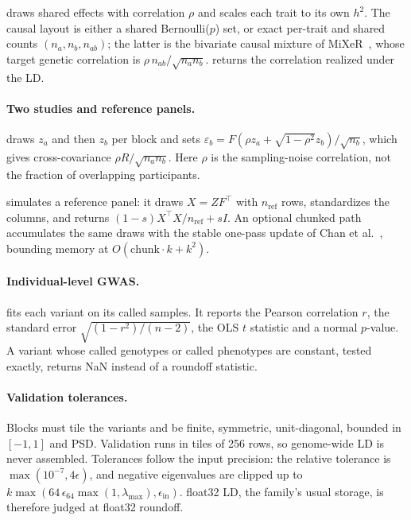\documentclass[11pt,a4paper]{article}
\begin{document}
 draws shared effects with correlation
$\rho$ and scales each trait to its own $h^2$. The causal layout is either
a shared Bernoulli($p$) set, or exact per-trait and shared counts
$(n_a,n_b,n_{ab})$; the latter is the bivariate causal mixture of
MiXeR~\cite{frei2019}, whose target genetic correlation is
$\rho\,n_{ab}/\sqrt{n_an_b}$.  returns the
correlation realized under the LD.

\paragraph{Two studies and reference panels.}
 draws $z_a$ and then $z_b$ per block and
sets $\varepsilon_b=F(\rho z_a+\sqrt{1-\rho^2}z_b)/\sqrt{n_b}$, which gives
cross-covariance $\rho R/\sqrt{n_an_b}$. Here $\rho$ is the
sampling-noise correlation, not the fraction of overlapping participants.

 simulates a reference panel: it draws $X=ZF^\top$ with
$n_{\mathrm{ref}}$ rows, standardizes the columns, and returns
$(1-s)X^\top X/n_{\mathrm{ref}}+sI$. An optional chunked path accumulates
the same draws with the stable one-pass update of Chan et
al.~\cite{chan1983}, bounding memory at $O(\mathrm{chunk}\cdot k+k^2)$.

\paragraph{Individual-level GWAS.}
 fits each variant on its called samples. It reports the
Pearson correlation $r$, the standard error $\sqrt{(1-r^2)/(n-2)}$, the OLS
$t$ statistic and a normal $p$-value. A variant whose called genotypes or
called phenotypes are constant, tested exactly, returns NaN instead of a
roundoff statistic.

\paragraph{Validation tolerances.}
Blocks must tile the variants and be finite, symmetric, unit-diagonal,
bounded in $[-1,1]$ and PSD. Validation runs in tiles of 256 rows, so
genome-wide LD is never assembled. Tolerances follow the input precision:
the relative tolerance is $\max(10^{-7},4\epsilon)$, and negative
eigenvalues are clipped up to
$k\max(64\,\epsilon_{64}\max(1,\lambda_{\max}),\epsilon_{\mathrm{in}})$.
float32 LD, the family's usual storage, is therefore judged at float32
roundoff.
\end{document}
